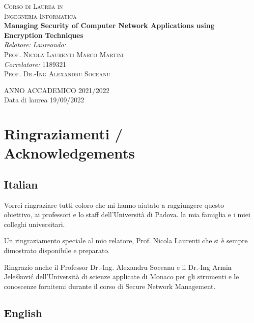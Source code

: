 \begin{titlepage}
\begin{center}
\vspace{0.4cm}
\textsc{\large Corso di Laurea in}\\
\textsc{\large Ingegneria Informatica}\\
\vfill
{ \LARGE \bfseries Managing Security of Computer Network Applications using Encryption Techniques
}\\
\vfill
\textit{\large Relatore:} \hfill \textit{\large Laureando:}\\
\textsc{\large Prof. Nicola Laurenti} \hfill \textsc{\large Marco Martini}\\
\textit{\large Correlatore:} \hfill \textsc{\large 1189321}\\
\textsc{\large Prof. Dr.-Ing Alexandru Soceanu} \hfill \textsc{}

\vfill
{\large ANNO ACCADEMICO 2021/2022} \\
{\large Data di laurea 19/09/2022}
\end{center}
\end{titlepage}

\thispagestyle{empty} %




\cleardoublepage

\section*{Ringraziamenti / Acknowledgements}

\subsection*{Italian}



Vorrei ringraziare tutti coloro che mi hanno aiutato a raggiungere questo obiettivo, ai professori e lo staff dell'Università di Padova. la mia famiglia e i miei colleghi universitari.

Un ringraziamento speciale al mio relatore, Prof. Nicola Laurenti che si è sempre dimostrato disponibile e preparato.

Ringrazio anche il Professor Dr.-Ing. Alexandru Soceanu e il Dr.-Ing Armin Jelešković dell'Università di scienze applicate di Monaco per gli strumenti e le conoscenze fornitemi durante il corso  di Secure Network Management.


\subsection*{English}

